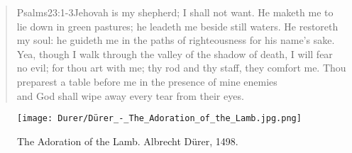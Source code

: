 \begin{verse}
				{Psalms}{23:1-3}{Jehovah is my shepherd; I shall not want. He maketh me to lie down in green pastures; he leadeth me beside still waters. He restoreth my soul: he guideth me in the paths of righteousness for his name’s sake. Yea, though I walk through the valley of the shadow of death, I will fear no evil; for thou art with me; thy rod and thy staff, they comfort me. Thou preparest a table before me in the presence of mine enemies}\\
 and God shall wipe away every tear from their eyes.%
\end{verse}
\begin{figure*}[p]
  	\centering
  	\texttt{[image: Durer/Dürer\_-\_The\_Adoration\_of\_the\_Lamb.jpg.png]}
  	\caption[The Adoration of the Lamb]{The Adoration of the Lamb. Albrecht Dürer, 1498.}
  \end{figure*}
